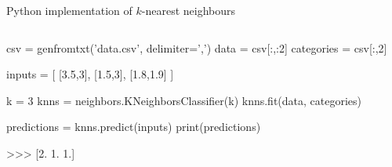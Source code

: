 \documentclass[compress]{beamer}
\begin{document}
\begin{frame}[fragile]{Python implementation of $k$-nearest neighbours}
\begin{onlyenv}
\begin{columns}
\begin{column}{0.6\linewidth}
\begin{pythoncode}
csv = genfromtxt('data.csv', delimiter=',')
data = csv[:,:2]
categories = csv[:,2]

inputs = [ [3.5,3], [1.5,3], [1.8,1.9] ]

k = 3
knns = neighbors.KNeighborsClassifier(k)
knns.fit(data, categories)

predictions = knns.predict(inputs)
print(predictions)

>>>  [2.  1.  1.]

\end{pythoncode}
    \end{column}
\end{columns}

\end{onlyenv}


\end{frame}
\end{document}
